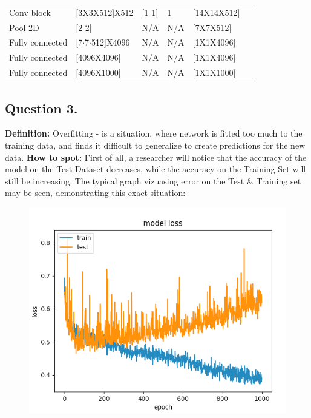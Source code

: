 \documentclass[a4paper]{iacas}
\begin{document}
\begin{table}[]
\begin{tabular}{|l|l|l|l|l|l}
Conv block      & {[}3X3X512{]}X512      & {[}1 1{]} & 1      & {[}14X14X512{]}   &  \\ \cline{1-5}
Pool 2D         & {[}2 2{]}              & N/A       & N/A    & {[}7X7X512{]}     &  \\ \cline{1-5}
Fully connected & {[}7$\cdot$7$\cdot$512{]}X4096 & N/A       & N/A    & {[}1X1X4096{]}    &  \\ \cline{1-5}
Fully connected & {[}4096X4096{]}        & N/A       & N/A    & {[}1X1X4096{]}    &  \\ \cline{1-5}
Fully connected & {[}4096X1000{]}        & N/A       & N/A    & {[}1X1X1000{]}    &  \\ \cline{1-5}
\end{tabular}
\end{table}

\newpage
\subsection{Question 3.}
\textbf{Definition: }Overfitting - is a situation, where network is fitted too much to the training data, and finds it difficult to generalize to create predictions for the new data. 
\newline
\textbf{How to spot: }First of all, a researcher will notice that the accuracy of the model on the Test Dataset decreases, while the accuracy on the Training Set will still be increasing. The typical graph vizuasing error on the Test \& Training set may be seen, demonstrating this exact situation:
\newline


\vskip 0.1in
\begin{figure}
	\includegraphics[scale=0.4]{imgs/overfit.PNG}
\end{figure}
\vskip 0.1in
\end{document}
